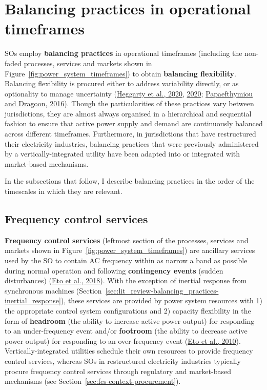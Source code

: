 \documentclass[12pt,a4paper,]{report}
\begin{document}
\hypertarget{sec:lit_review-balancing_practices}{%
\section{Balancing practices in operational
timeframes}\label{sec:lit_review-balancing_practices}}

SOs employ \textbf{balancing practices} in operational timeframes
(including the non-faded processes, services and markets shown in
Figure~\ref{fig:power_system_timeframes}) to obtain \textbf{balancing
flexibility}. Balancing flexibility is procured either to address
variability directly, or as optionality to manage uncertainty
(\protect\hyperlink{ref-heggartyQuantifyingPowerSystem2020}{Heggarty et
al., 2020},
\protect\hyperlink{ref-heggartyQuantifyingPowerSystem2020}{2020};
\protect\hyperlink{ref-papaefthymiou100RenewableEnergy2016}{Papaefthymiou
and Dragoon, 2016}). Though the particularities of these practices vary
between jurisdictions, they are almost always organised in a
hierarchical and sequential fashion to ensure that active power supply
and demand are continuously balanced across different timeframes.
Furthermore, in jurisdictions that have restructured their electricity
industries, balancing practices that were previously administered by a
vertically-integrated utility have been adapted into or integrated with
market-based mechanisms.

In the subsections that follow, I describe balancing practices in the
order of the timescales in which they are relevant.

\hypertarget{sec:lit_review-balancing_practices-fcs}{%
\subsection{Frequency control
services}\label{sec:lit_review-balancing_practices-fcs}}

\textbf{Frequency control services} (leftmost section of the processes,
services and markets shown in Figure~\ref{fig:power_system_timeframes})
are ancillary services used by the SO to contain AC frequency within as
narrow a band as possible during normal operation and following
\textbf{contingency events} (sudden disturbances)
(\protect\hyperlink{ref-etoFrequencyControlRequirements2018}{Eto et al.,
2018}). With the exception of inertial response from synchronous
machines
(Section~\ref{sec:lit_review-balancing_practices-inertial_response}),
these services are provided by power system resources with 1) the
appropriate control system configurations and 2) capacity flexibility in
the form of \textbf{headroom} (the ability to increase active power
output) for responding to an under-frequency event and/or
\textbf{footroom} (the ability to decrease active power output) for
responding to an over-frequency event
(\protect\hyperlink{ref-etoUseFrequencyResponse2010}{Eto et al., 2010}).
Vertically-integrated utilities schedule their own resources to provide
frequency control services, whereas SOs in restructured electricity
industries typically procure frequency control services through
regulatory and market-based mechanisms (see
Section~\ref{sec:fcs-context-procurement}).
\end{document}
